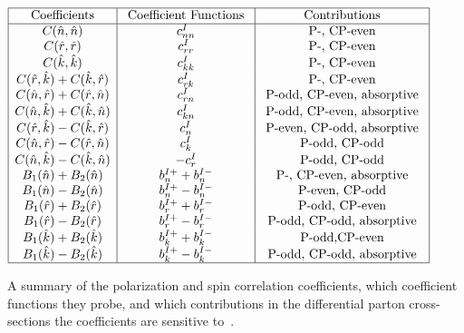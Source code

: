 \begin{table}[!htb]
\begin{center}
\begin{math}
\begin{array}{|c|c|c|}
\hline 
\text { Coefficients } & \text { Coefficient Functions } & \text { Contributions } \\
\hline 
C(\hat{n},\hat{n}) & c_{n n}^I & \text { P-, CP-even } \\
C(\hat{r},\hat{r}) & c_{r r}^I & \text { P-, CP-even } \\
C(\hat{k},\hat{k}) & c_{k k}^I & \text { P-, CP-even } \\
C(\hat{r},\hat{k})+C(\hat{k},\hat{r}) & c_{r k}^I & \text { P-, CP-even } \\
C(\hat{n},\hat{r})+C(\hat{r},\hat{n}) & c_{r n}^I & \text { P-odd, CP-even, absorptive } \\
C(\hat{n},\hat{k})+C(\hat{k},\hat{n}) & c_{k n}^I & \text { P-odd, CP-even, absorptive } \\
C(\hat{r},\hat{k})-C(\hat{k},\hat{r}) & c_n^I & \text { P-even, CP-odd, absorptive } \\
C(\hat{n},\hat{r})-C(\hat{r},\hat{n}) & c_k^I & \text { P-odd, CP-odd } \\
C(\hat{n},\hat{k})-C(\hat{k},\hat{n}) & -c_r^I & \text { P-odd, CP-odd } \\
B_1(\hat{n})+B_2(\hat{n}) & b_n^{I+}+b_n^{I-} & \text { P-, CP-even, absorptive } \\
B_1(\hat{n})-B_2(\hat{n}) & b_n^{I+}-b_n^{I-} & \text { P-even, CP-odd } \\
B_1(\hat{r})+B_2(\hat{r}) & b_r^{I+}+b_r^{I-} & \text { P-odd, CP-even } \\
B_1(\hat{r})-B_2(\hat{r}) & b_r^{I+}-b_r^{I-} & \text { P-odd, CP-odd, absorptive } \\
B_1(\hat{k})+B_2(\hat{k}) & b_k^{I+}+b_k^{I-} & \text { P-odd,CP-even } \\
B_1(\hat{k})-B_2(\hat{k}) & b_k^{I+}-b_k^{I-} & \text { P-odd, CP-odd, absorptive } \\
\hline
\end{array}
\end{math}
\caption{A summary of the polarization and spin correlation coefficients, which coefficient functions they probe, and which contributions in the differential parton cross-sections the coefficients are sensitive to~\cite{Bernreuther}. 
        }
\label{coefficients_sensitive}
\end{center}
\end{table}

